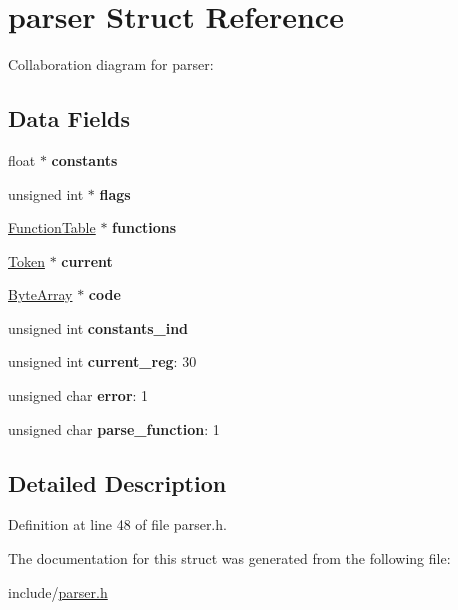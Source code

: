 \hypertarget{structparser}{}\section{parser Struct Reference}
\label{structparser}


Collaboration diagram for parser\+:
\subsection*{Data Fields}
\begin{DoxyCompactItemize}
\item 
\mbox{\label{structparser_ab5fe297961fb42bd5dd14409e147bbfd}} 
float $\ast$ {\bfseries constants}
\item 
\mbox{\label{structparser_a06a1f17756d650ba4f62fd23a9333917}} 
unsigned int $\ast$ {\bfseries flags}
\item 
\mbox{\label{structparser_aab428d152dc81cb2bafa3c96f7ffbb4c}} 
\hyperlink{structfunction__table}{Function\+Table} $\ast$ {\bfseries functions}
\item 
\mbox{\label{structparser_a55cfdfd34735320efdb329bbfcaf0ca9}} 
\hyperlink{structtoken}{Token} $\ast$ {\bfseries current}
\item 
\mbox{\label{structparser_a1a5543bd6d6afa6b29acaf90d9eef4c7}} 
\hyperlink{structbyte__array}{Byte\+Array} $\ast$ {\bfseries code}
\item 
\mbox{\label{structparser_ab4c43edecec9d6604d42f808642d17ea}} 
unsigned int {\bfseries constants\+\_\+ind}
\item 
\mbox{\label{structparser_a43e2375d2188e415fdd24c392c1438e2}} 
unsigned int {\bfseries current\+\_\+reg}\+: 30
\item 
\mbox{\label{structparser_ad1a43225c5713c1323a70000d334a0e6}} 
unsigned char {\bfseries error}\+: 1
\item 
\mbox{\label{structparser_a1e4ff0dff923406f1621c2d16c9c5ae0}} 
unsigned char {\bfseries parse\+\_\+function}\+: 1
\end{DoxyCompactItemize}


\subsection{Detailed Description}


Definition at line 48 of file parser.\+h.



The documentation for this struct was generated from the following file\+:\begin{DoxyCompactItemize}
\item 
include/\hyperlink{parser_8h}{parser.\+h}\end{DoxyCompactItemize}
